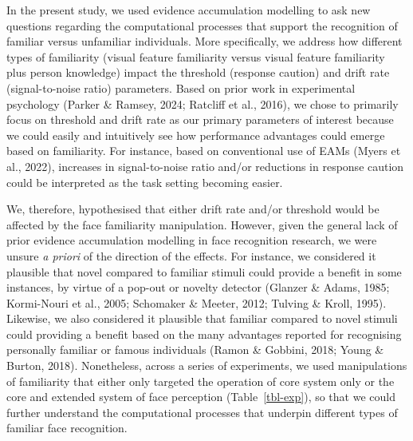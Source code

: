 \documentclass[
  letterpaper,
  DIV=11,
  numbers=noendperiod]{scrartcl}
\begin{document}
In the present study, we used evidence accumulation modelling to ask new
questions regarding the computational processes that support the
recognition of familiar versus unfamiliar individuals. More
specifically, we address how different types of familiarity (visual
feature familiarity versus visual feature familiarity plus person
knowledge) impact the threshold (response caution) and drift rate
(signal-to-noise ratio) parameters. Based on prior work in experimental
psychology (Parker \& Ramsey, 2024; Ratcliff et al., 2016), we chose to
primarily focus on threshold and drift rate as our primary parameters of
interest because we could easily and intuitively see how performance
advantages could emerge based on familiarity. For instance, based on
conventional use of EAMs (Myers et al., 2022), increases in
signal-to-noise ratio and/or reductions in response caution could be
interpreted as the task setting becoming easier.

We, therefore, hypothesised that either drift rate and/or threshold
would be affected by the face familiarity manipulation. However, given
the general lack of prior evidence accumulation modelling in face
recognition research, we were unsure \emph{a priori} of the direction of
the effects. For instance, we considered it plausible that novel
compared to familiar stimuli could provide a benefit in some instances,
by virtue of a pop-out or novelty detector (Glanzer \& Adams, 1985;
Kormi-Nouri et al., 2005; Schomaker \& Meeter, 2012; Tulving \& Kroll,
1995). Likewise, we also considered it plausible that familiar compared
to novel stimuli could providing a benefit based on the many advantages
reported for recognising personally familiar or famous individuals
(Ramon \& Gobbini, 2018; Young \& Burton, 2018). Nonetheless, across a
series of experiments, we used manipulations of familiarity that either
only targeted the operation of core system only or the core and extended
system of face perception (Table~\ref{tbl-exp}), so that we could
further understand the computational processes that underpin different
types of familiar face recognition.
\end{document}
